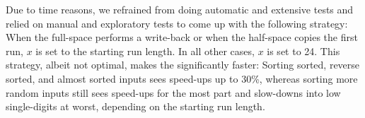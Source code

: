 Due to time reasons, we refrained from doing automatic and extensive tests and relied on manual and exploratory tests to come up with the following strategy:
When the full-space \MS{} performs a write-back or when the half-space \MS{} copies the first run, \(x\) is set to the starting run length.
In all other cases, \(x\) is set to 24.
This strategy, albeit not optimal, makes the \MS*{} significantly faster:
Sorting sorted, reverse sorted, and almost sorted inputs sees speed-ups up to 30\%, whereas sorting more random inputs still sees speed-ups for the most part and slow-downs into low single-digits at worst, depending on the starting run length.




